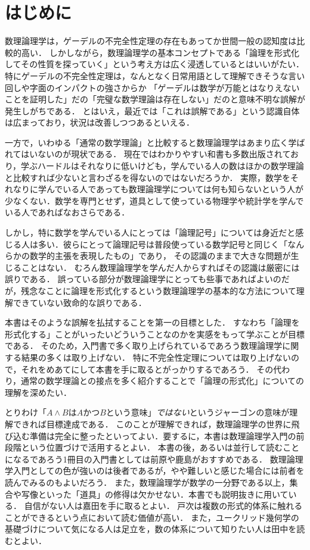 \chapter{はじめに}

数理論理学は，ゲーデルの不完全性定理の存在もあってか世間一般の認知度は比較的高い．
しかしながら，数理論理学の基本コンセプトである「論理を形式化してその性質を探っていく」という考え方は広く浸透しているとはいいがたい．
特にゲーデルの不完全性定理は，なんとなく日常用語として理解できそうな言い回しや字面のインパクトの強さからか
「ゲーデルは数学が万能とはなりえないことを証明した」だの「完璧な数学理論は存在しない」だのと意味不明な誤解が発生しがちである．
とはいえ，最近では「これは誤解である」という認識自体は広まっており，状況は改善しつつあるといえる．

一方で，いわゆる「通常の数学理論」と比較すると数理論理学はあまり広く学ばれてはいないのが現状である．
現在ではわかりやすい和書も多数出版されており，学ぶハードルはそれなりに低いけども，学んでいる人の数はほかの数学理論と比較すれば少ないと言わざるを得ないのではないだろうか．
実際，数学をそれなりに学んでいる人であっても数理論理学については何も知らないという人が少なくない．数学を専門とせず，道具として使っている物理学や統計学を学んでいる人であればなおさらである．

しかし，特に数学を学んでいる人にとっては「論理記号」については身近だと感じる人は多い．彼らにとって論理記号は普段使っている数学記号と同じく「なんらかの数学的主張を表現したもの」であり，
その認識のままで大きな問題が生じることはない．
むろん数理論理学を学んだ人からすればその認識は厳密には誤りである．
誤っている部分が数理論理学にとっても些事であればよいのだが，残念なことに論理を形式化するという数理論理学の基本的な方法について理解できていない致命的な誤りである．

本書はそのような誤解を払拭することを第一の目標とした．
すなわち「論理を形式化する」ことがいったいどういうことなのかを実感をもって学ぶことが目標である．
そのため，入門書で多く取り上げられているであろう数理論理学に関する結果の多くは取り上げない．
特に不完全性定理については取り上げないので，それをめあてにして本書を手に取るとがっかりするであろう．
その代わり，通常の数学理論との接点を多く紹介することで「論理の形式化」についての理解を深めたい．

とりわけ「\(A \land B\)は\(A\)かつ\(B\)という意味」\emph{ではない}というジャーゴンの意味が理解できれば目標達成である．
このことが理解できれば，数理論理学の世界に飛び込む準備は完全に整ったといってよい．要するに，本書は数理論理学入門の前段階という位置づけで活用するとよい．
本書の後，あるいは並行して読むことになるであろう1冊目の入門書としては前原\cite{maehara2005}や鹿島\cite{kashima2009}がおすすめである．
数理論理学入門としての色が強いのは後者であるが，やや難しいと感じた場合には前者を読んでみるのもよいだろう．
また，数理論理学が数学の一分野である以上，集合や写像といった「道具」の修得は欠かせない．本書でも説明抜きに用いている．
自信がない人は嘉田\cite{kada2008}を手に取るとよい．
戸次\cite{bekki2012}は複数の形式的体系に触れることができるという点において読む価値が高い．
また，ユークリッド幾何学の基礎づけについて気になる人は足立\cite{adachi2019}を，数の体系について知りたい人は田中\cite{tanaka2019}を読むとよい．

